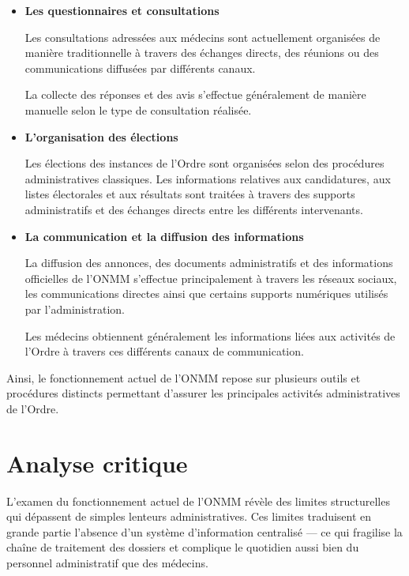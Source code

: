 ﻿\documentclass[12pt,a4paper]{report}
\begin{document}
\begin{itemize}
Les documents liés aux réclamations sont ensuite conservés dans des
archives administratives physiques.

\item \textbf{Les questionnaires et consultations}

Les consultations adressées aux médecins sont actuellement organisées
de manière traditionnelle à travers des échanges directs, des réunions
ou des communications diffusées par différents canaux.

La collecte des réponses et des avis s’effectue généralement de manière
manuelle selon le type de consultation réalisée.

\item \textbf{L’organisation des élections}

Les élections des instances de l’Ordre sont organisées selon des
procédures administratives classiques. Les informations relatives aux
candidatures, aux listes électorales et aux résultats sont traitées à
travers des supports administratifs et des échanges directs entre les
différents intervenants.

\item \textbf{La communication et la diffusion des informations}

La diffusion des annonces, des documents administratifs et des
informations officielles de l’ONMM s’effectue principalement à travers
les réseaux sociaux, les communications directes ainsi que certains
supports numériques utilisés par l’administration.

Les médecins obtiennent généralement les informations liées aux
activités de l’Ordre à travers ces différents canaux de communication.

\end{itemize}

Ainsi, le fonctionnement actuel de l’ONMM repose sur plusieurs outils
et procédures distincts permettant d’assurer les principales activités
administratives de l’Ordre.

\section{Analyse critique}

L'examen du fonctionnement actuel de l'ONMM révèle des limites
structurelles qui dépassent de simples lenteurs administratives.
Ces limites traduisent en grande partie l'absence d'un système
d'information centralisé — ce qui fragilise la chaîne de traitement
des dossiers et complique le quotidien aussi bien du personnel
administratif que des médecins.
\end{document}
